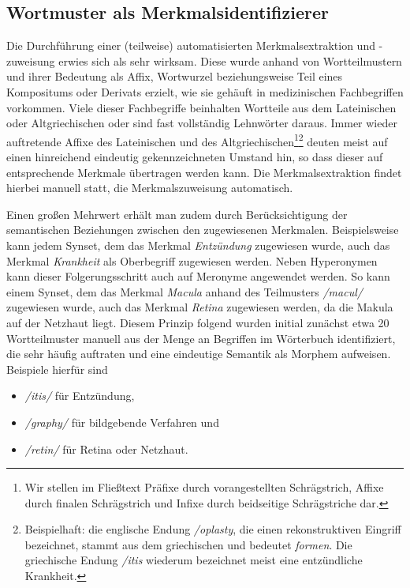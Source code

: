 \documentclass[pagesize,paper=A4,DIV=calc,fontsize=12pt,draft=false]{scrreprt}
\begin{document}
\subsection{Wortmuster als Merkmalsidentifizierer}

Die Durchführung einer (teilweise) automatisierten Merkmalsextraktion und -zuweisung erwies sich als sehr wirksam. 
Diese wurde anhand von Wortteilmustern und ihrer Bedeutung als Affix, Wortwurzel beziehungsweise Teil eines Kompositums oder Derivats erzielt, wie sie gehäuft in medizinischen Fachbegriffen vorkommen. 
Viele dieser Fachbegriffe beinhalten Wortteile aus dem Lateinischen oder Altgriechischen oder sind fast vollständig Lehnwörter daraus. 
Immer wieder auftretende Affixe des Lateinischen und des Altgriechischen\footnote{Wir stellen im Fließtext Präfixe durch vorangestellten Schrägstrich, Affixe durch finalen Schrägstrich und Infixe durch beidseitige Schrägstriche dar.}\footnote{Beispielhaft: die englische Endung \emph{/oplasty}, die einen rekonstruktiven Eingriff bezeichnet, stammt aus dem griechischen und bedeutet \emph{formen}. 
Die griechische Endung \emph{/itis} wiederum bezeichnet meist eine entzündliche Krankheit.} deuten meist auf einen hinreichend eindeutig gekennzeichneten Umstand hin, so dass dieser auf entsprechende Merkmale übertragen werden kann. 
Die Merkmalsextraktion findet hierbei manuell statt, die Merkmalszuweisung automatisch. 

Einen großen Mehrwert erhält man zudem durch Berücksichtigung der semantischen Beziehungen zwischen den zugewiesenen Merkmalen. 
Beispielsweise kann jedem Synset, dem das Merkmal \emph{Entzündung} zugewiesen wurde, auch das Merkmal \emph{Krankheit} als Oberbegriff zugewiesen werden. 
Neben Hyperonymen kann dieser Folgerungsschritt auch auf Meronyme angewendet werden. 
So kann einem Synset, dem das Merkmal \emph{Macula} anhand des Teilmusters \emph{/macul/} zugewiesen wurde, auch das Merkmal \emph{Retina} zugewiesen werden, da die Makula auf der Netzhaut liegt. 
Diesem Prinzip folgend wurden initial zunächst etwa 20 Wortteilmuster manuell aus der Menge an Begriffen im Wörterbuch identifiziert, die sehr häufig auftraten und eine eindeutige Semantik als Morphem aufweisen. 
Beispiele hierfür sind 

\begin{itemize}
\item
 \emph{/itis/} für Entzündung,
\item
 \emph{/graphy/} für bildgebende Verfahren und
\item
 \emph{/retin/} für Retina oder Netzhaut.
\end{itemize}
\end{document}
